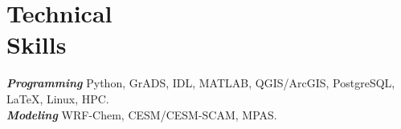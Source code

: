 \documentclass[margin,line]{resume}
\begin{document}
\begin{resume}
\begin{enumerate}[topsep=1pt, partopsep=1pt, itemsep=0.5pt, parsep=0.1pt, leftmargin=15pt,label=\arabic*.]
			
			
		\end{enumerate}
		

		
		\vspace{-0.4cm}
			
		\section{\mysidestyle \textbf{\textcolor{sep}{Technical \\Skills}}}
		
		\textbf{\emph{\textcolor{sep}{Programming}}} \hspace{1mm} Python, GrADS, IDL, MATLAB, QGIS/ArcGIS, PostgreSQL,  \LaTeX, Linux, HPC.\\
		\textbf{\emph{\textcolor{sep}{Modeling}}} \hspace{8mm} WRF-Chem, CESM/CESM-SCAM, MPAS.  
	
		\vspace*{-3mm}
				

\end{resume}
\end{document}
